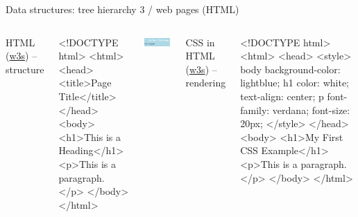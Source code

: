 \begin{frame}[fragile]{Data structures: tree hierarchy 3 / web pages (HTML)}
  \begin{columns}[T,onlytextwidth]
    HTML (\href{https://www.w3schools.com/html/default.asp}{w3s}) -- structure
\begin{htmlcode}
<!DOCTYPE html>
<html>
 <head>
   <title>Page Title</title>
 </head>
 <body>
  <h1>This is a Heading</h1>
  <p>This is a paragraph.</p>
 </body>
</html>
\end{htmlcode}

      
      \begin{block}{}
        \includegraphics[width=0.97\textwidth]{img/css-example.png}
      \end{block}



CSS in HTML (\href{https://www.w3schools.com/css/default.asp}{w3s}) -- rendering
\begin{htmlcode}
<!DOCTYPE html>
<html>
  <head>
    <style>
body {
  background-color: lightblue;
}
h1 {
  color: white;
  text-align: center;
}
p {
  font-family: verdana;
  font-size: 20px;
}
    </style>
  </head>
  <body>
    <h1>My First CSS Example</h1>
    <p>This is a paragraph.</p>
  </body>
</html>
\end{htmlcode}

  \end{columns}
\end{frame}

